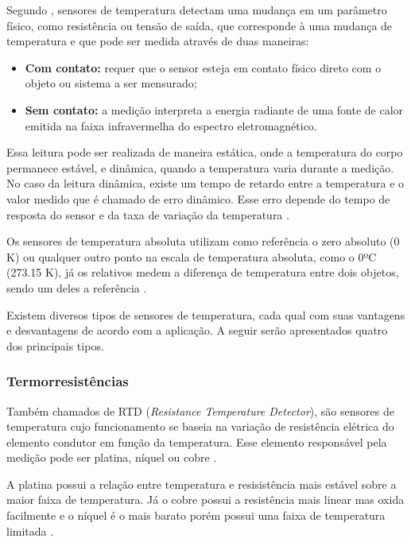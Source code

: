 Segundo , sensores de temperatura detectam uma mudança em um parâmetro físico, como
resistência ou tensão de saída, que corresponde à uma mudança de temperatura e que pode ser medida através de
duas maneiras:

\begin{itemize}
	\item \textbf{Com contato:} requer que o sensor esteja em contato físico direto com o objeto ou
	sistema a ser mensurado;
	\item \textbf{Sem contato:} a medição interpreta a energia radiante de uma fonte de calor emitida na
	faixa infravermelha do espectro eletromagnético.
\end{itemize}

Essa leitura pode ser realizada de maneira estática, onde a temperatura do corpo permanece estável, e
dinâmica, quando a temperatura varia durante a medição. No caso da leitura dinâmica, existe um tempo de
retardo entre a temperatura e o valor medido que é chamado de erro dinâmico. Esse erro depende do tempo de
resposta do sensor e da taxa de variação da temperatura \cite{peeters_peetermans_indesteege2007}.

Os sensores de temperatura absoluta utilizam como referência o zero absoluto (0 K) ou qualquer outro ponto na
escala de temperatura absoluta, como o 0ºC (273.15 K), já os relativos medem a diferença de temperatura entre
dois objetos, sendo um deles a referência \cite{fraden2010}.

Existem diversos tipos de sensores de temperatura, cada qual com suas vantagens e desvantagens de acordo com
a aplicação. A seguir serão apresentados quatro dos principais tipos.

\subsubsection{Termorresistências}
Também chamados de RTD (\textit{Resistance Temperature Detector}), são sensores de temperatura cujo
funcionamento se baseia na variação de resistência elétrica do elemento condutor em função da temperatura.
Esse elemento responsável pela medição pode ser platina, níquel ou cobre \cite{thomazini_albuquerque2005}.

A platina possui a relação entre temperatura e resisistência mais estável sobre a maior faixa de temperatura.
Já o cobre possui a resistência mais linear mas oxida facilmente e o níquel é o mais barato porém possui uma
faixa de temperatura limitada \cite{burns2014}.

